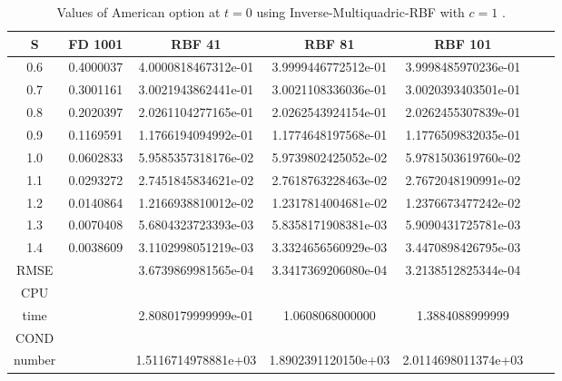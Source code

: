 \documentclass[12pt]{article}
\numberwithin{equation}{section} %
\begin{document}
\begin{table}[h]
\centering
\begin{tabular}{|c|c|c|c|c|c|c|}
  \hline
  S & FD 1001  & RBF 41 & RBF 81 & RBF 101 \\
  \hline
  0.6 & 0.4000037 &  4.0000818467312e-01 & 3.9999446772512e-01 & 3.9998485970236e-01 \\
  0.7 & 0.3001161  & 3.0021943862441e-01 & 3.0021108336036e-01 &3.0020393403501e-01 \\
  0.8 & 0.2020397  & 2.0261104277165e-01 & 2.0262543924154e-01 & 2.0262455307839e-01 \\
  0.9 & 0.1169591  & 1.1766194094992e-01 &  1.1774648197568e-01 &  1.1776509832035e-01\\
  1.0 & 0.0602833  & 5.9585357318176e-02 & 5.9739802425052e-02 &  5.9781503619760e-02\\
  1.1 & 0.0293272  & 2.7451845834621e-02 & 2.7618763228463e-02 &   2.7672048190991e-02\\
  1.2 & 0.0140864  &  1.2166938810012e-02 &  1.2317814004681e-02  & 1.2376673477242e-02 \\
  1.3 & 0.0070408  &  5.6804323723393e-03 & 5.8358171908381e-03 & 5.9090431725781e-03 \\
  1.4 & 0.0038609  & 3.1102998051219e-03 &  3.3324656560929e-03&  3.4470898426795e-03\\
  \hline
  RMSE &   & 3.6739869981565e-04 &3.3417369206080e-04 & 3.2138512825344e-04\\
  \hline
  CPU &   &  &  &  \\
  time  &   &  2.8080179999999e-01 & 1.0608068000000 & 1.3884088999999 \\
  \hline
   COND &   &  &  &  \\
  number  &   & 1.5116714978881e+03 &  1.8902391120150e+03 & 2.0114698011374e+03 \\
  \hline
\end{tabular}
  \caption{Values of American option at $t=0$ using Inverse-Multiquadric-RBF with $c=1$ .}\label{Tab_1DFinal}
\end{table}
\end{document}
